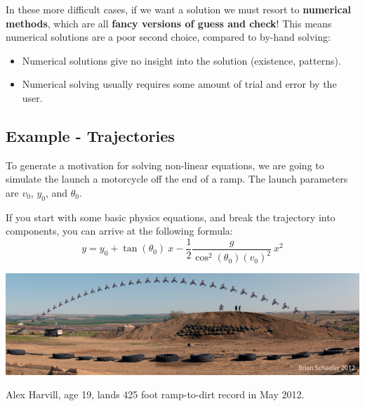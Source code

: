 In these more difficult cases, if we want a solution we must resort to
{\bf numerical methods}, which are all {\bf fancy versions of guess
  and check}!  This means numerical solutions are a poor second
choice, compared to by-hand solving:
\begin{itemize}
\item Numerical solutions give no insight into the solution
  (existence, patterns).
\item Numerical solving usually requires some amount of trial and
  error by the user.
\end{itemize}

\newpage

\subsection*{Example - Trajectories}
To generate a motivation for solving non-linear equations, we are
going to simulate the launch a motorcycle off the end of a ramp.  The
launch parameters are $v_0$, $y_0$, and $\theta_0$.

If you start with some basic physics equations, and break the trajectory into components,
you can arrive at the following formula:
$$ y= y_0 + \tan(\theta_0) ~x - \frac{1}{2} \frac{g}{\cos^2(\theta_0) (v_0)^2} ~x^2 $$



\newpage
\begin{center}
\includegraphics[width=8.5in]{graphics/notes_02_MotorcycleJump_2014}


Alex Harvill, age 19, lands 425 foot ramp-to-dirt record in May 2012.
\end{center}

\newpage



